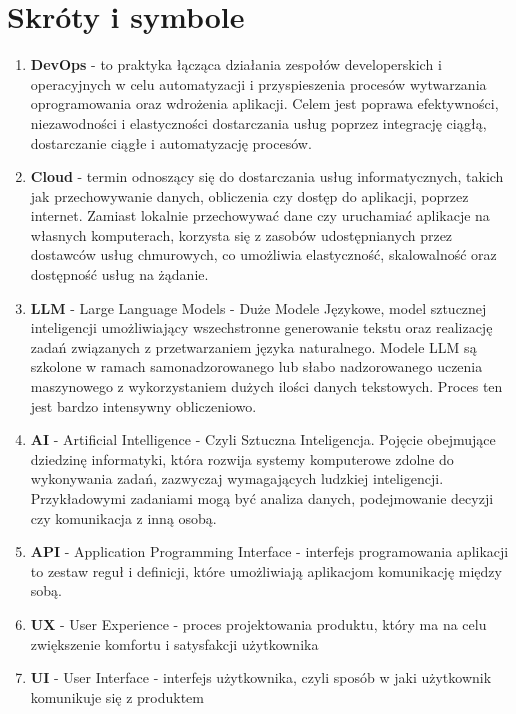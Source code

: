 \section{Skróty i symbole}

 \begin{enumerate}
    \item {\bf DevOps} - to praktyka łącząca działania zespołów developerskich i operacyjnych w celu automatyzacji i przyspieszenia procesów wytwarzania oprogramowania oraz wdrożenia aplikacji. Celem jest poprawa efektywności, niezawodności i elastyczności dostarczania usług poprzez integrację ciągłą, dostarczanie ciągłe i automatyzację procesów.
    
    \item {\bf Cloud} -  termin odnoszący się do dostarczania usług informatycznych, takich jak przechowywanie danych, obliczenia czy dostęp do aplikacji, poprzez internet. Zamiast lokalnie przechowywać dane czy uruchamiać aplikacje na własnych komputerach, korzysta się z zasobów udostępnianych przez dostawców usług chmurowych, co umożliwia elastyczność, skalowalność oraz dostępność usług na żądanie.
    
    \item {\bf LLM} - Large Language Models - Duże Modele Językowe, model sztucznej inteligencji umożliwiający wszechstronne generowanie tekstu oraz realizację zadań związanych z przetwarzaniem języka naturalnego. Modele LLM są szkolone w ramach samonadzorowanego lub słabo nadzorowanego uczenia maszynowego z wykorzystaniem dużych ilości danych tekstowych. Proces ten jest bardzo intensywny obliczeniowo.
    
    \item {\bf AI} - Artificial Intelligence - Czyli Sztuczna Inteligencja. Pojęcie obejmujące dziedzinę informatyki, która rozwija systemy komputerowe zdolne do wykonywania zadań, zazwyczaj wymagających ludzkiej inteligencji. Przykładowymi zadaniami mogą być analiza danych, podejmowanie decyzji czy komunikacja z inną osobą.
    
    \item {\bf API} - Application Programming Interface - interfejs programowania aplikacji to zestaw reguł i definicji, które umożliwiają aplikacjom komunikację między sobą.
    
    \item {\bf UX} - User Experience - proces projektowania produktu, który ma na celu zwiększenie komfortu i satysfakcji użytkownika
    
    \item {\bf UI} - User Interface - interfejs użytkownika, czyli sposób w jaki użytkownik komunikuje się z produktem
   

\end{enumerate}
